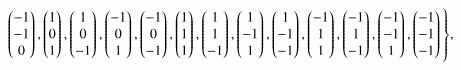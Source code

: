 \begin{itemize}
\begin{align}
\begin{split}
                    &\begin{pmatrix} -1 \\ -1 \\ 0 \end{pmatrix}, \begin{pmatrix} 1 \\ 0 \\ 1 \end{pmatrix}, \begin{pmatrix} 1 \\ 0 \\ -1 \end{pmatrix}, \begin{pmatrix} -1 \\ 0 \\ 1 \end{pmatrix}, \begin{pmatrix} -1 \\ 0 \\ -1 \end{pmatrix}, \begin{pmatrix} 1 \\ 1 \\ 1 \end{pmatrix}, \begin{pmatrix} 1 \\ 1 \\ -1 \end{pmatrix}, \begin{pmatrix} 1 \\ -1 \\ 1 \end{pmatrix}, \begin{pmatrix} 1 \\ -1 \\ -1 \end{pmatrix}, \begin{pmatrix} -1 \\ 1 \\ 1 \end{pmatrix}, \begin{pmatrix} -1 \\ 1 \\ -1 \end{pmatrix}, \begin{pmatrix} -1 \\ -1 \\ 1 \end{pmatrix}, \begin{pmatrix} -1 \\ -1 \\ -1 \end{pmatrix} \vast\},

\end{split}
\end{align}
\end{itemize}
